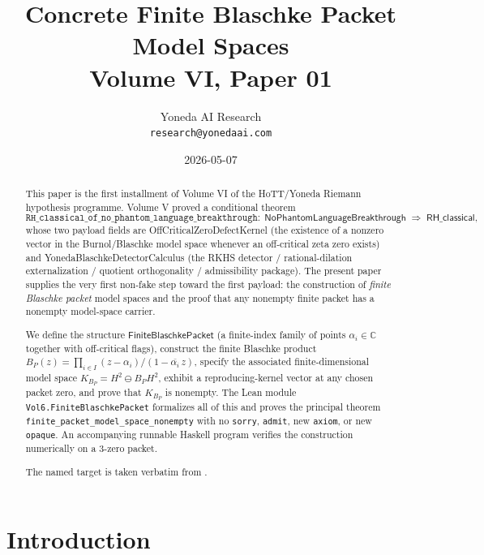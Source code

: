 \documentclass[11pt]{article}
\title{Concrete Finite Blaschke Packet Model Spaces \\
       \large Volume VI, Paper 01}
\author{Yoneda AI Research \\
        \texttt{research@yonedaai.com}}
\date{2026-05-07}
\theoremstyle{plain}
\theoremstyle{definition}
\theoremstyle{remark}
\newcommand{\HtH}{H^{2}}
\newcommand{\KBp}{K_{B_{P}}}
\newcommand{\C}{\mathbb{C}}
\newcommand{\conj}[1]{\overline{#1}}
\newcommand{\FiniteBlaschkePacket}{\textsf{FiniteBlaschkePacket}}
\newcommand{\code}[1]{\texttt{#1}}
\begin{document}
\maketitle

\begin{abstract}
This paper is the first installment of Volume VI of the
HoTT/Yoneda Riemann hypothesis programme.  Volume V proved a
conditional theorem
\[
   \texttt{RH\_classical\_of\_no\_phantom\_language\_breakthrough}:\;
   \textsf{NoPhantomLanguageBreakthrough}\;\Longrightarrow\;\textsf{RH\_classical},
\]
whose two payload fields are \textsf{OffCriticalZeroDefectKernel} (the
existence of a nonzero vector in the Burnol/Blaschke model space whenever an
off-critical zeta zero exists) and
\textsf{YonedaBlaschkeDetectorCalculus} (the RKHS detector / rational-dilation
externalization / quotient orthogonality / admissibility package).  The
present paper supplies the very first non-fake step toward the first payload:
the construction of \emph{finite Blaschke packet} model spaces and the
proof that any nonempty finite packet has a nonempty model-space carrier.

We define the structure $\FiniteBlaschkePacket$ (a finite-index family of
points $\alpha_{i}\in\C$ together with off-critical flags), construct the
finite Blaschke product
\(B_{P}(z) = \prod_{i\in I} (z-\alpha_{i})/(1-\conj{\alpha_{i}}\,z)\),
specify the associated finite-dimensional model space
\(\KBp = \HtH \ominus B_{P}\HtH\), exhibit a reproducing-kernel vector at any
chosen packet zero, and prove that \(\KBp\) is nonempty.  The Lean module
\code{Vol6.FiniteBlaschkePacket} formalizes all of this and proves the
principal theorem
\code{finite\_packet\_model\_space\_nonempty} with no \code{sorry},
\code{admit}, new \code{axiom}, or new \code{opaque}.  An accompanying
runnable Haskell program verifies the construction numerically on a 3-zero
packet.

The named target is taken verbatim from \cite[Sec.~``Recommended Proof
Sprint Order'' item 1 and Sec.~``Immediate Next Lean File'']{vol5NextSteps}.
\end{abstract}

\tableofcontents

\section{Introduction}\label{sec:intro}
\end{document}
